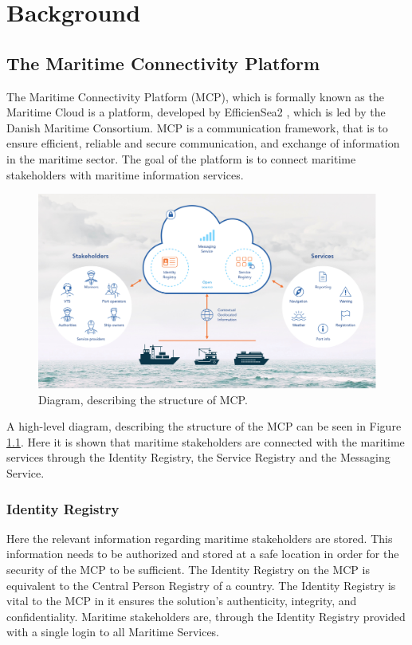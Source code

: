 \chapter{Background}

\section{The Maritime Connectivity Platform}
The Maritime Connectivity Platform (MCP), which is formally known as the Maritime Cloud is a platform, developed by EfficienSea2 \cite{efficienSea2}, which is led by the Danish Maritime Consortium. MCP is a communication framework, that is to ensure efficient, reliable and secure communication, and exchange of information in the maritime sector.
The goal of the platform is to connect maritime stakeholders with maritime information services.
\begin{figure}
	\includegraphics[width=1\textwidth]{figures/MCPStructure}
	\caption{Diagram, describing the structure of MCP. \cite{efficienSea2}}
	\label{fig:MCPStruct}
\end{figure}\noindent
A high-level diagram, describing the structure of the MCP can be seen in Figure \ref{fig:MCPStruct}. Here it is shown that maritime stakeholders are connected with the maritime services through the Identity Registry, the Service Registry and the Messaging Service.

\subsection{Identity Registry}
Here the relevant information regarding maritime stakeholders are stored. This information needs to be authorized and stored at a safe location in order for the security of the MCP to be sufficient. The Identity Registry on the MCP is equivalent to the Central Person Registry of a country. The Identity Registry is vital to the MCP in it ensures the solution's authenticity, integrity, and confidentiality. Maritime stakeholders are, through the Identity Registry provided with a single login to all Maritime Services.\cite{efficienSea2}
